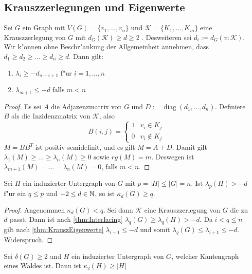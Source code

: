 \subsection{Krauszzerlegungen und Eigenwerte}

\begin{theorem}
    \label{thm:KrauszEigenwerte}
    Sei $G$ ein Graph mit $V(G)=\{v_1,\dots,v_n\}$ und $\mathcal K=\{K_1,\dots,K_m\}$ eine Krauszzerlegung von $G$ mit $d_G(\mathcal K) \geq d \geq 2$ . Desweiteren sei $d_i := d_G(v:\mathcal K)$. 
    Wir k"onnen ohne Beschr"ankung der Allgemeinheit annehmen, dass $d_1\geq d_2 \geq \dots \geq d_n \geq d$.
    Dann gilt: 
    \begin{enumerate}[label=(\alph*)]
        \item $\lambda_i \geq -d_{n-i+1}$ f"ur $i = 1, \dots , n$
        \item $\lambda_{m+1} \leq -d$ falls $m < n$
    \end{enumerate}
\end{theorem}
\begin{proof}
    Es sei $A$ die Adjazenzmatrix von $G$ und $D := \operatorname{diag}(d_1,\dots,d_n)$. Definiere $B$ als die Inzidenzmatrix von $\mathcal K$, also $$B(i,j) = \begin{cases}
        1 & v_i \in K_j \\ 0 & v_i \notin K_j
    \end{cases}$$ 
    $M=BB^{T}$ ist positiv semidefinit, und es gilt $M = A+D$. Damit gilt $\lambda_1(M) \geq \dots \geq \lambda_n(M) \geq 0$ sowie $rg(M) = m$. Deswegen ist $\lambda_{m+1}(M)=\dots=\lambda_n(M) = 0$, falls $m < n$. 
\end{proof}
\begin{corollary}
    \label{cor:Korollar1}
    Sei $H$ ein induzierter Untergraph von $G$ mit $p = \left| H\right| \leq \left|G\right| = n$.
    Ist $\lambda_p (H) > -d $ f"ur ein $q \leq p$ und $-2 \leq d \in {\mathbb{N}}$, so ist $\kappa_d(G) \geq q$.
\end{corollary}
\begin{proof}
    Angenommen $\kappa_d(G) < q$. Sei dann $\mathcal{K}$ eine Krauszzerlegung von $G$ die zu $d$ passt. Dann ist nach \ref{thm:Interlacing} $\lambda_{q}(G)\geq \lambda_{q}(H) > -d$. 
    Da $i < q \leq n$ gilt nach \ref{thm:KrauszEigenwerte} $\lambda_{i+1}\leq -d$ und somit $\lambda_{q}(G)\leq \lambda_{i+1} \leq -d$. Widerspruch.
\end{proof}

\begin{corollary}
    Sei $\delta(G) \geq 2$ und $H$ ein induzierter Untergraph von $G$, welcher Kantengraph eines Waldes ist. 
    Dann ist $\kappa_{2}(H)\geq \left|H\right|$
\end{corollary}

